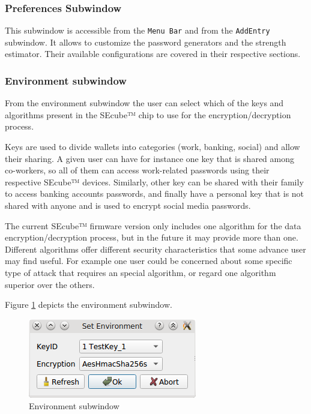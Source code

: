 \subsubsection*{Preferences Subwindow}

This subwindow is accessible from the \texttt{Menu Bar} and from the \texttt{AddEntry} subwindow. It allows to customize the password generators and the strength estimator. Their available configurations are covered in their respective sections. 

\subsubsection*{Environment subwindow}

From the environment subwindow the user can select which of the keys and algorithms present in the SEcube™ chip to use for the encryption/decryption process. 

Keys are used to divide wallets into categories (work, banking, social) and allow their sharing.  A given user can have for instance one key that is shared among co-workers, so all of them can access work-related passwords using their respective SEcube™ devices. Similarly, other key can be shared with their family to access banking accounts passwords, and finally have a personal key that is not shared with anyone and is used to encrypt social media passwords. 

The current SEcube™ firmware version only includes one algorithm for the data encryption/decryption process, but in the future it may provide more than one. Different algorithms offer different security characteristics that some advance user may find useful. For example one user could be concerned about some specific type of attack that requires an special algorithm, or regard one algorithm superior over the others. 

Figure \ref{fig:envi} depicts the environment subwindow.

\begin{figure}[htb]
  \centering
  \captionsetup{justification=centering}
  \centerline{\includegraphics[width=0.5\columnwidth]{chapters/figures/development/envi.png}}
  \caption{Environment subwindow}
  \label{fig:envi}
\end{figure}


